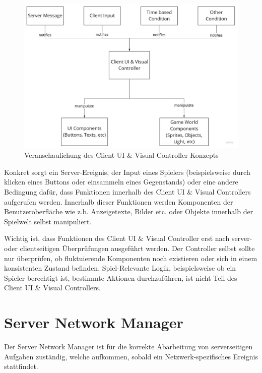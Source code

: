 \begin{figure}
	\centering
	\includegraphics[width=150mm]{images/Client_UI_und_Visual_Konzept.jpg}
	\caption[Client UI \& Visual Controller Diagramm]{Veranschaulichung des Client UI \& Visual Controller Konzepts}
	\label{pic:Client_UI_und_Visual_Konzept}
\end{figure}

Konkret sorgt ein Server-Ereignis, der Input eines Spielers (beispielsweise durch klicken eines Buttons oder einsammeln eines Gegenstands) oder eine andere Bedingung dafür, dass Funktionen innerhalb des Client UI \& Visual Controllers aufgerufen werden. Innerhalb dieser Funktionen werden Komponenten der Benutzeroberfläche wie z.b. Anzeigetexte, Bilder etc. oder Objekte innerhalb der Spielwelt selbst manipuliert.

Wichtig ist, dass Funktionen des Client UI \& Visual Controller erst nach server- oder clientseitigen Überprüfungen ausgeführt werden. Der Controller selbst sollte nur überprüfen, ob fluktuierende Komponenten noch existieren oder sich in einem konsistenten Zustand befinden. Spiel-Relevante Logik, beispielsweise ob ein Spieler berechtigt ist, bestimmte Aktionen durchzuführen, ist nicht Teil des Client UI \& Visual Controllers.

\section{Server Network Manager}

Der Server Network Manager ist für die korrekte Abarbeitung von serverseitigen Aufgaben zuständig, welche aufkommen, sobald ein Netzwerk-spezifisches Ereignis stattfindet.

